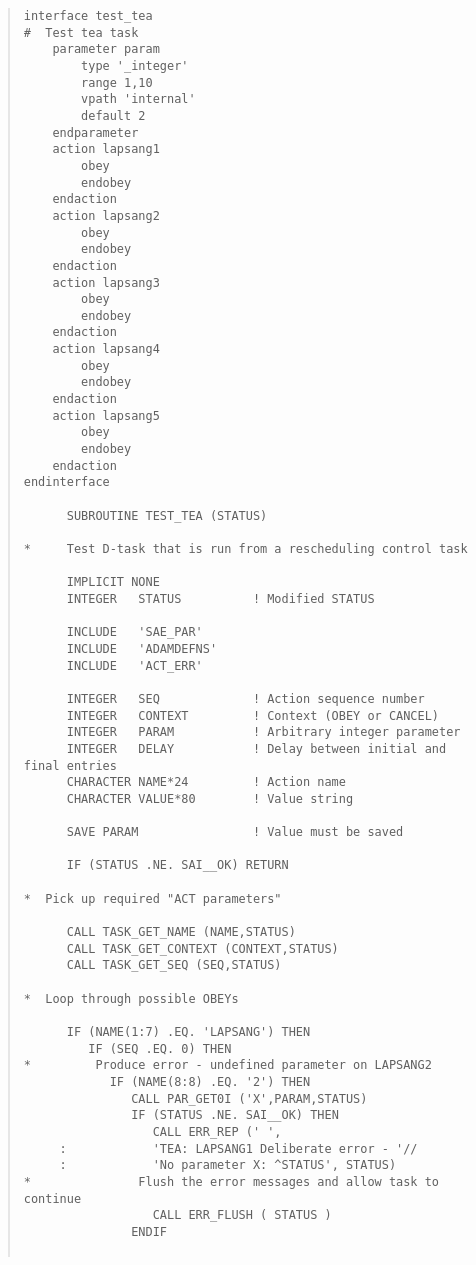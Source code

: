 \documentclass[twoside,11pt]{article}
\renewcommand{\_}{\texttt{\symbol{95}}}
\begin{document}
\small \begin{quote} \begin{verbatim}
interface test_tea
#  Test tea task
    parameter param
        type '_integer'
        range 1,10
        vpath 'internal'
        default 2
    endparameter
    action lapsang1
        obey
        endobey
    endaction
    action lapsang2
        obey
        endobey
    endaction
    action lapsang3
        obey
        endobey
    endaction
    action lapsang4
        obey
        endobey
    endaction
    action lapsang5
        obey
        endobey
    endaction
endinterface

      SUBROUTINE TEST_TEA (STATUS)

*     Test D-task that is run from a rescheduling control task

      IMPLICIT NONE
      INTEGER   STATUS          ! Modified STATUS

      INCLUDE   'SAE_PAR'
      INCLUDE   'ADAMDEFNS'
      INCLUDE   'ACT_ERR'

      INTEGER   SEQ             ! Action sequence number
      INTEGER   CONTEXT         ! Context (OBEY or CANCEL)
      INTEGER   PARAM           ! Arbitrary integer parameter
      INTEGER   DELAY           ! Delay between initial and final entries
      CHARACTER NAME*24         ! Action name
      CHARACTER VALUE*80        ! Value string

      SAVE PARAM                ! Value must be saved

      IF (STATUS .NE. SAI__OK) RETURN

*  Pick up required "ACT parameters"

      CALL TASK_GET_NAME (NAME,STATUS)
      CALL TASK_GET_CONTEXT (CONTEXT,STATUS)
      CALL TASK_GET_SEQ (SEQ,STATUS)

*  Loop through possible OBEYs

      IF (NAME(1:7) .EQ. 'LAPSANG') THEN
         IF (SEQ .EQ. 0) THEN
*         Produce error - undefined parameter on LAPSANG2
            IF (NAME(8:8) .EQ. '2') THEN
               CALL PAR_GET0I ('X',PARAM,STATUS)
               IF (STATUS .NE. SAI__OK) THEN
                  CALL ERR_REP (' ',
     :            'TEA: LAPSANG1 Deliberate error - '//
     :            'No parameter X: ^STATUS', STATUS)
*               Flush the error messages and allow task to continue
                  CALL ERR_FLUSH ( STATUS )
               ENDIF


\end{verbatim}
\end{quote}
\end{document}
